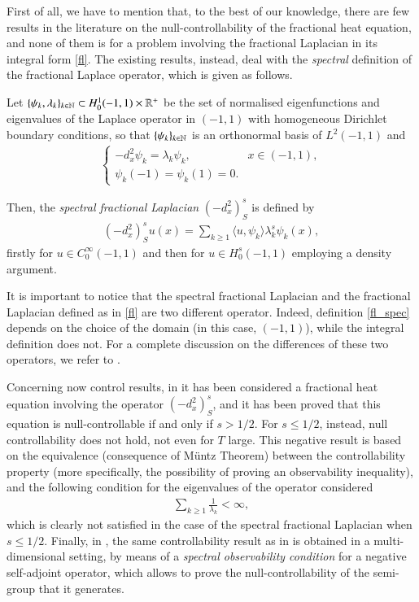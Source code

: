 First of all, we have to mention that, to the best of our knowledge, there are few results in the literature on the null-controllability of the fractional heat equation, and none of them is for a problem involving the fractional Laplacian in its integral form \eqref{fl}. The existing results, instead, deal with the \textit{spectral} definition of the fractional Laplace operator, which is given as follows.

Let $\{\psi_k,\lambda_k\}_{k\in\mathbb{N}}\subset H_0^1(-1,1)\times\mathbb{R}^+$ be the set of normalised eigenfunctions and eigenvalues of the Laplace operator in $(-1,1)$ with homogeneous Dirichlet boundary conditions, so that $\{\psi_k\}_{k\in\mathbb{N}}$ is an orthonormal basis of $L^2(-1,1)$ and         
\begin{align*}
	\begin{cases}
		-d_x^2\psi_k =\lambda_k\psi_k, & x\in (-1,1), 
		\\
		\psi_k(-1)=\psi_k(1)=0.
	\end{cases}
\end{align*}

Then, the \textit{spectral fractional Laplacian} $(-d_x^2)^s_S$ is defined by
\begin{align}\label{fl_spec}
	(-d_x^2)^s_S u(x) = \sum_{k\geq 1}\langle u,\psi_k\rangle \lambda_k^s\psi_k(x),
\end{align}
firstly for $u\in C_0^{\infty}(-1,1)$ and then for $u\in H_0^s(-1,1)$ employing a density argument.

It is important to notice that the spectral fractional Laplacian and the fractional Laplacian defined as in \eqref{fl} are two different operator. Indeed, definition \eqref{fl_spec} depends on the choice of the domain (in this case, $(-1,1)$), while the integral definition does not. For a complete discussion on the differences of these two operators, we refer to \cite{servadei2014spectrum}.

Concerning now control results, in \cite{micu2006controllability} it has been considered a fractional heat equation involving the operator $(-d_x^2)^s_S$, and it has been proved that this equation is null-controllable if and only if $s>1/2$. For $s\leq 1/2$, instead, null controllability does not hold, not even for $T$ large. This negative result is based on the equivalence (consequence of M\"untz Theorem) between the controllability property (more specifically, the possibility of proving an observability inequality), and the following condition for the eigenvalues of the operator considered
\begin{align}\label{eigen_cond}
	\sum_{k\geq 1} \frac{1}{\lambda_k}<\infty,
\end{align} 
which is clearly not satisfied in the case of the spectral fractional Laplacian when $s\leq 1/2$. Finally, in \cite{miller2006controllability}, the same controllability result as in \cite{micu2006controllability} is obtained in a multi-dimensional setting, by means of a  \textit{spectral observability condition} for a negative self-adjoint operator, which allows to prove the null-controllability of the semi-group that it generates.

